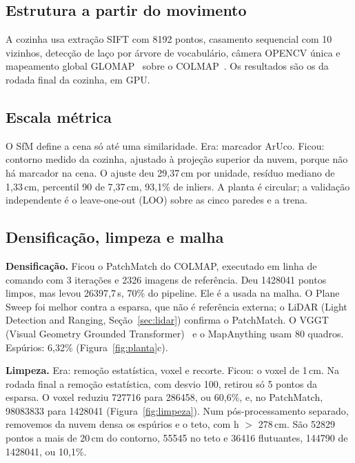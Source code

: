 \subsection{Estrutura a partir do movimento}

A cozinha usa extração SIFT com 8192 pontos, casamento sequencial com 10 vizinhos, detecção de laço por árvore de vocabulário, câmera OPENCV única e mapeamento global GLOMAP~\cite{pan2024glomap} sobre o COLMAP~\cite{schoenberger2016sfm}. Os resultados são os da rodada final da cozinha, em GPU.

\subsection{Escala métrica}

O SfM define a cena só até uma similaridade. Era: marcador ArUco. Ficou: contorno medido da cozinha, ajustado à projeção superior da nuvem, porque não há marcador na cena. O ajuste deu 29,37\,cm por unidade, resíduo mediano de 1,33\,cm, percentil 90 de 7,37\,cm, 93,1\% de inliers. A planta é circular; a validação independente é o leave-one-out (LOO) sobre as cinco paredes e a trena.

\subsection{Densificação, limpeza e malha}

\textbf{Densificação.} Ficou o PatchMatch do COLMAP, executado em linha de comando com 3 iterações e 2326 imagens de referência. Deu 1428041 pontos limpos, mas levou 26397,7\,s, 70\% do pipeline. Ele é a \href{https://drive.google.com/file/d/1ssycb31eRPuREXVo524tTzj8dl8ZinmP/view}{} usada na malha. O Plane Sweep foi melhor contra a esparsa, que não é referência externa; o LiDAR (Light Detection and Ranging, Seção~\ref{sec:lidar}) confirma o PatchMatch. O VGGT (Visual Geometry Grounded Transformer)~\cite{wang2025vggt} e o MapAnything usam 80 quadros. Espúrios: 6,32\% (Figura~\ref{fig:planta}c).

\textbf{Limpeza.} Era: remoção estatística, voxel e recorte. Ficou: o voxel de 1\,cm. Na rodada final a remoção estatística, com desvio 100, retirou só 5 pontos da esparsa. O voxel reduziu 727716 para 286458, ou 60,6\%, e, no PatchMatch, 98083833 para 1428041 (Figura~\ref{fig:limpeza}). Num pós-processamento separado, removemos da nuvem densa os espúrios e o teto, com h $>$ 278\,cm. São 52829 pontos a mais de 20\,cm do contorno, 55545 no teto e 36416 flutuantes, 144790 de 1428041, ou 10,1\%.

